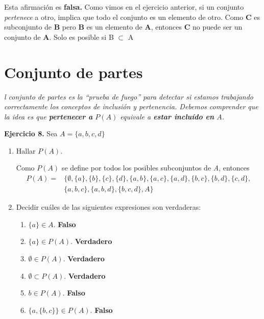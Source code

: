 Esta afirmaci\'on es \textbf{falsa.} Como vimos en el ejercicio anterior, si un conjunto \textit{pertenece} a otro, implica que todo el conjunto es un elemento de otro. Como \textbf{C} es subconjunto de \textbf{B} pero \textbf{B} es un elemento de \textbf{A}, entonces \textbf{C} no puede ser un conjunto de \textbf{A}. Solo es posible si B $\subset$ A

\section{Conjunto de partes}

\textit{l conjunto de partes es la “prueba de fuego” para detectar si estamos trabajando correctamente los conceptos de
inclusión y pertenencia. Debemos comprender que la idea es que \textbf{pertenecer a} $P(A)$ equivale a \textbf{estar incluído en} $A$.}

\textbf{Ejercicio 8.} Sea $A = \{a, b, c, d\}$
\begin{enumerate}
	\item Hallar $P(A)$.
	
	Como $P(A)$ se define por todos los posibles subconjuntos de \textit{A}, entonces 
	\begin{align*}
		P(A) = &\{\emptyset, \{a\}, \{b\}, \{c\}, \{d\}, \{a, b\}, \{a, c\}, \{a, d\}, \{b, c\}, \{b, d\}, \{c, d\},\\
		 &\{a, b, c\}, \{a, b, d\}, \{b, c, d\}, A\}
	\end{align*}
	
	\item Decidir cu\'ales de las siguientes expresiones son verdaderas:
	\begin{enumerate}
		\item $\{a\} \in A$. \textbf{Falso}
		\item $\{a\} \in P(A)$. \textbf{Verdadero}
		\item $\emptyset \in P(A)$. \textbf{Verdadero}
		\item $\emptyset \subset P(A)$. \textbf{Verdadero}
		\item $b \in P(A)$. \textbf{Falso}
		\item $\{a, \{b, c\}\} \in P(A)$. \textbf{Falso}
	\end{enumerate}
\end{enumerate}

